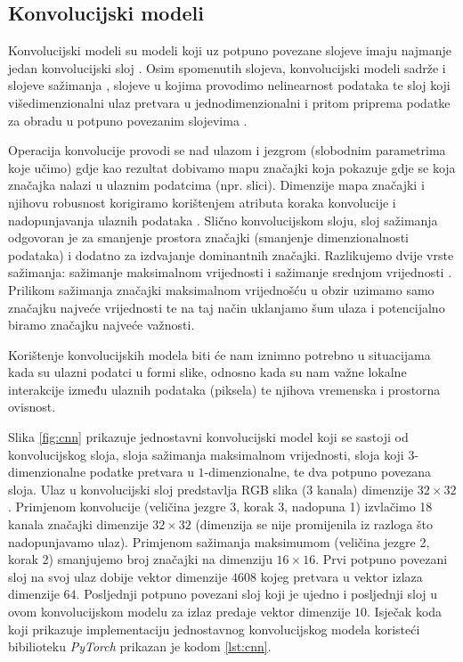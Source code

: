 \subsection{Konvolucijski modeli}

Konvolucijski modeli  su modeli koji uz potpuno povezane slojeve imaju najmanje jedan konvolucijski sloj . Osim spomenutih slojeva, konvolucijski modeli sadrže i slojeve sažimanja , slojeve u kojima provodimo nelinearnost podataka te sloj koji višedimenzionalni ulaz pretvara u jednodimenzionalni i pritom priprema podatke za obradu u potpuno povezanim slojevima .

Operacija konvolucije provodi se nad ulazom i jezgrom  (slobodnim parametrima koje učimo) gdje kao rezultat dobivamo mapu značajki koja pokazuje gdje se koja značajka nalazi u ulaznim podatcima (npr. slici). Dimenzije mapa značajki i njihovu robusnost korigiramo korištenjem atributa koraka konvolucije  i nadopunjavanja ulaznih podataka . Slično konvolucijskom sloju, sloj sažimanja odgovoran je za smanjenje prostora značajki (smanjenje dimenzionalnosti podataka) i dodatno za izdvajanje dominantnih značajki. Razlikujemo dvije vrste sažimanja: sažimanje maksimalnom vrijednosti  i sažimanje srednjom vrijednosti . Prilikom sažimanja značajki maksimalnom vrijednošću u obzir uzimamo samo značajku najveće vrijednosti te na taj način uklanjamo šum ulaza i potencijalno biramo značajku najveće važnosti.

Korištenje konvolucijskih modela biti će nam iznimno potrebno u situacijama kada su ulazni podatci u formi slike, odnosno kada su nam važne lokalne interakcije između ulaznih podataka (piksela) te njihova vremenska i prostorna ovisnost.

Slika \ref{fig:cnn} \cite{NNsvg} prikazuje jednostavni konvolucijski model koji se sastoji od konvolucijskog sloja, sloja sažimanja maksimalnom vrijednosti, sloja koji $3$-dimenzionalne podatke pretvara u $1$-dimenzionalne, te dva potpuno povezana sloja. Ulaz u konvolucijski sloj predstavlja RGB slika (3 kanala) dimenzije $32 \times 32$. Primjenom konvolucije (veličina jezgre 3, korak 3, nadopuna 1) izvlačimo 18 kanala značajki dimenzije $32 \times 32$ (dimenzija se nije promijenila iz razloga što nadopunjavamo ulaz). Primjenom sažimanja maksimumom (veličina jezgre 2, korak 2) smanjujemo broj značajki na dimenziju $16 \times 16$. Prvi potpuno povezani sloj na svoj ulaz dobije vektor dimenzije $4608$ kojeg pretvara u vektor izlaza dimenzije $64$. Posljednji potpuno povezani sloj koji je ujedno i posljednji sloj u ovom konvolucijskom modelu za izlaz predaje vektor dimenzije $10$. Isječak koda koji prikazuje implementaciju jednostavnog konvolucijskog modela koristeći bibilioteku \textit{PyTorch} prikazan je kodom \ref{lst:cnn}.

